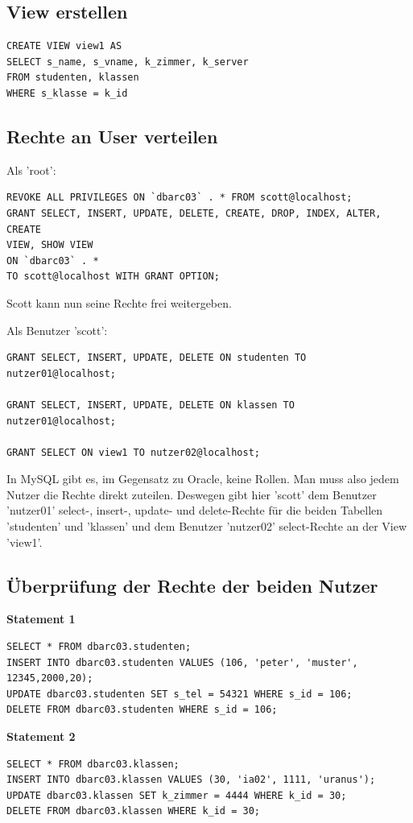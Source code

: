 \documentclass[10pt]{scrreprt}
\newcommand{\Bold}[1]{\textbf{#1}} %
\begin{document}
\subsection{View erstellen}
\begin{lstlisting}[style=sql]
CREATE VIEW view1 AS
SELECT s_name, s_vname, k_zimmer, k_server
FROM studenten, klassen
WHERE s_klasse = k_id
\end{lstlisting}

\subsection{Rechte an User verteilen}
Als 'root':
\begin{lstlisting}[style=sql]
REVOKE ALL PRIVILEGES ON `dbarc03` . * FROM scott@localhost;
GRANT SELECT, INSERT, UPDATE, DELETE, CREATE, DROP, INDEX, ALTER, CREATE
VIEW, SHOW VIEW
ON `dbarc03` . *
TO scott@localhost WITH GRANT OPTION;
\end{lstlisting}
Scott kann nun seine Rechte frei weitergeben.

Als Benutzer 'scott':
\begin{lstlisting}[style=sql]
GRANT SELECT, INSERT, UPDATE, DELETE ON studenten TO
nutzer01@localhost;

GRANT SELECT, INSERT, UPDATE, DELETE ON klassen TO
nutzer01@localhost;

GRANT SELECT ON view1 TO nutzer02@localhost;
\end{lstlisting}
In MySQL gibt es, im Gegensatz zu Oracle, keine Rollen. Man muss also jedem Nutzer die Rechte direkt zuteilen.\newline
Deswegen gibt hier 'scott' dem Benutzer 'nutzer01' select-, insert-, update- und delete-Rechte für die beiden Tabellen 'studenten' und 'klassen' und dem Benutzer 'nutzer02' select-Rechte an der View 'view1'.\newline\newline

\subsection{Überprüfung der Rechte der beiden Nutzer}
\Bold{Statement 1}
\begin{lstlisting}[style=sql]
SELECT * FROM dbarc03.studenten;
INSERT INTO dbarc03.studenten VALUES (106, 'peter', 'muster', 12345,2000,20);
UPDATE dbarc03.studenten SET s_tel = 54321 WHERE s_id = 106;
DELETE FROM dbarc03.studenten WHERE s_id = 106;
\end{lstlisting}
\Bold{Statement 2}
\begin{lstlisting}[style=sql]
SELECT * FROM dbarc03.klassen;
INSERT INTO dbarc03.klassen VALUES (30, 'ia02', 1111, 'uranus');
UPDATE dbarc03.klassen SET k_zimmer = 4444 WHERE k_id = 30;
DELETE FROM dbarc03.klassen WHERE k_id = 30;
\end{lstlisting}
\end{document}
